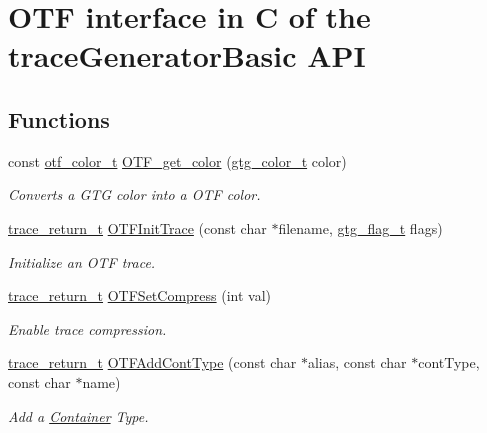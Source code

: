 \hypertarget{group__cotf}{\section{O\-T\-F interface in C of the trace\-Generator\-Basic A\-P\-I}
\label{group__cotf}
}
\subsection*{Functions}
\begin{DoxyCompactItemize}
\item 
const \hyperlink{GTGOTF__Structs_8h_a5431afdab8fe4162268778e93f0950c9}{otf\-\_\-color\-\_\-t} \hyperlink{group__cotf_ga28de2748e0f27c11131e4bb097a25bf9}{O\-T\-F\-\_\-get\-\_\-color} (\hyperlink{GTGColor_8h_a7d118edf2d6e2588a0323079259fb0d6}{gtg\-\_\-color\-\_\-t} color)
\begin{DoxyCompactList}\small\item\em Converts a G\-T\-G color into a O\-T\-F color. \end{DoxyCompactList}\item 
\hyperlink{group__type_ga1f1b68fb37d7331f03a48ef0993a0788}{trace\-\_\-return\-\_\-t} \hyperlink{group__cotf_ga87f8715c93843ed56a9f4d9ed2e7d6d8}{O\-T\-F\-Init\-Trace} (const char $\ast$filename, \hyperlink{GTGBasic_8h_a7a5d407dd23dfced8b5937332ff80972}{gtg\-\_\-flag\-\_\-t} flags)
\begin{DoxyCompactList}\small\item\em Initialize an O\-T\-F trace. \end{DoxyCompactList}\item 
\hyperlink{group__type_ga1f1b68fb37d7331f03a48ef0993a0788}{trace\-\_\-return\-\_\-t} \hyperlink{group__cotf_ga5a2457a81c113ea6b241a68942a63371}{O\-T\-F\-Set\-Compress} (int val)
\begin{DoxyCompactList}\small\item\em Enable trace compression. \end{DoxyCompactList}\item 
\hyperlink{group__type_ga1f1b68fb37d7331f03a48ef0993a0788}{trace\-\_\-return\-\_\-t} \hyperlink{group__cotf_ga38f77fbd3406ac7528fa0d7f18328c55}{O\-T\-F\-Add\-Cont\-Type} (const char $\ast$alias, const char $\ast$cont\-Type, const char $\ast$name)
\begin{DoxyCompactList}\small\item\em Add a \hyperlink{structContainer}{Container} Type. \end{DoxyCompactList}\item 

\end{DoxyCompactItemize}
